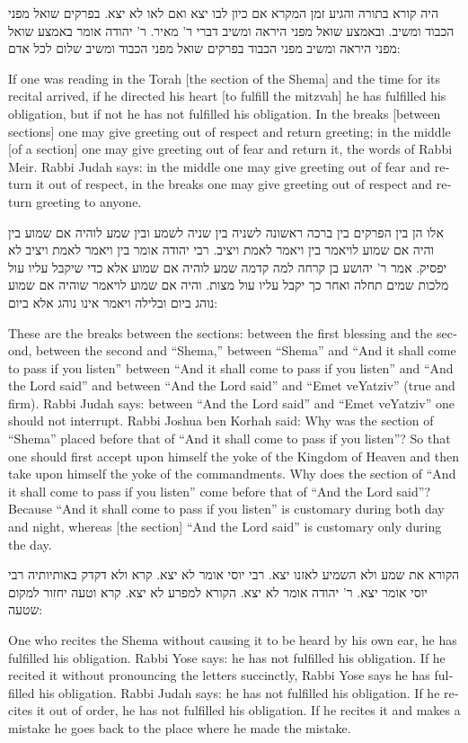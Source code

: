 \documentclass[12pt, openany]{book}
\newcommand{\textblock}[2]{
	{\fontsize{16pt}{20pt}\selectfont #1\\}
	
	\begin{english}
		#2
	\end{english}
	\clearpage
}
\begin{document}
\textblock{היה קורא בתורה והגיע זמן המקרא אם כיון לבו יצא ואם לאו לא יצא. בפרקים שואל מפני הכבוד ומשיב. ובאמצע שואל מפני היראה ומשיב דברי ר' מאיר. ר' יהודה אומר באמצע שואל מפני היראה ומשיב מפני הכבוד בפרקים שואל מפני הכבוד ומשיב שלום לכל אדם: }{If one was reading in the Torah {[the section of the Shema]} and the time for its recital arrived, if he directed his heart {[to fulfill the mitzvah]} he has fulfilled his obligation, but if not he has not fulfilled his obligation. In the breaks {[between sections]} one may give greeting out of respect and return greeting; in the middle {[of a section]} one may give greeting out of fear and return it, the words of Rabbi Meir. Rabbi Judah says: in the middle one may give greeting out of fear and return it out of respect, in the breaks one may give greeting out of respect and return greeting to anyone.}
\textblock{אלו הן בין הפרקים בין ברכה ראשונה לשניה בין שניה לשמע ובין שמע לוהיה אם שמוע בין והיה אם שמוע לויאמר בין ויאמר לאמת ויציב. רבי יהודה אומר בין ויאמר לאמת ויציב לא יפסיק. אמר ר' יהושע בן קרחה למה קדמה שמע לוהיה אם שמוע אלא כדי שיקבל עליו עול מלכות שמים תחלה ואחר כך יקבל עליו עול מצות. והיה אם שמוע לויאמר שוהיה אם שמוע נוהג ביום ובלילה ויאמר אינו נוהג אלא ביום: }{These are the breaks between the sections: between the first blessing and the second,   between the second and “Shema,” between “Shema” and “And it shall come to pass if you listen” between “And it shall come to pass if you listen” and “And the Lord said” and between “And the Lord said” and “Emet veYatziv” (true and firm). Rabbi Judah says: between “And the Lord said” and “Emet veYatziv” one should not interrupt. Rabbi Joshua ben Korhah said: Why was the section of “Shema” placed before that of “And it shall come to pass if you listen”? So that one should first accept upon himself the yoke of the Kingdom of Heaven and then take upon himself the yoke of the commandments. Why does the section of “And it shall come to pass if you listen” come before that of “And the Lord said”? Because “And it shall come to pass if you listen” is customary during both day and night,   whereas {[the section]} “And the Lord said” is customary only during the day.}
\textblock{הקורא את שמע ולא השמיע לאזנו יצא. רבי יוסי אומר לא יצא. קרא ולא דקדק באותיותיה רבי יוסי אומר יצא. ר' יהודה אומר לא יצא. הקורא למפרע לא יצא. קרא וטעה יחזור למקום שטעה: }{One who recites the Shema without causing it to be heard by his own ear, he has fulfilled his obligation. Rabbi Yose says: he has not fulfilled his obligation. If he recited it without pronouncing the letters succinctly, Rabbi Yose says he has fulfilled his obligation. Rabbi Judah says: he has not fulfilled his obligation. If he recites it out of order, he has not fulfilled his obligation. If he recites it and makes a mistake he goes back to the place where he made the mistake.}
\end{document}
